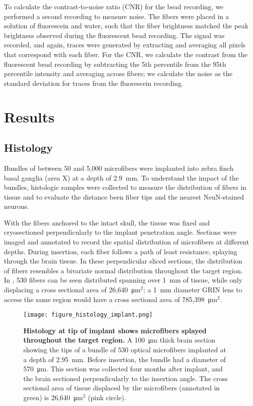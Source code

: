To calculate the contrast-to-noise ratio (CNR) for the bead recording, 
we performed a second recording to measure noise. The fibers were placed 
in a solution of fluorescein and water, such that the fiber brightness 
matched the peak brightness observed during the fluorescent bead recording. 
The signal was recorded, and again, traces were generated by extracting 
and averaging all pixels that correspond with each fiber. For the CNR, we 
calculate the contrast from the fluorescent bead recording by subtracting 
the 5th percentile from the 95th percentile intensity and averaging across 
fibers; we calculate the noise as the standard deviation for traces from 
the fluorescein recording.

\section{Results}

\subsection{Histology}

Bundles of between 50 and 5,000 microfibers were implanted into 
zebra finch basal ganglia (area X) at a depth of 2.9~mm. To 
understand the impact of the bundles, histologic samples 
were collected to measure the distribution of 
fibers in tissue and to evaluate the distance been fiber tips and 
the nearest NeuN-stained neurons.

With the fibers anchored to the intact skull, the tissue was 
fixed and cryosectioned perpendicularly to the implant penetration 
angle. Sections were imaged and annotated to record the spatial 
distribution of microfibers at different depths. During insertion, 
each fiber follows a path of least resistance, splaying through 
the brain tissue. In these perpendicular sliced sections, the 
distribution of fibers resembles a bivariate normal distribution 
throughout the target region. In , 530 fibers can 
be seen distributed spanning over 1~mm of tissue, while only 
displacing a cross sectional area of 26,640~\si{\micro\meter}$^2$; a 
1~mm diameter GRIN lens to access the same region would have a 
cross sectional area of 785,398~\si{\micro\meter}$^2$.

\begin{figure}
\texttt{[image: figure\_histology\_implant.png]}
\caption[Histology showing microfibers splayed 
throughout target region.]{\textbf{Histology at tip of implant shows 
microfibers splayed throughout the target region.} 
A 100~\si{\micro\meter} thick brain section showing the tips of a 
bundle of 530 optical microfibers implanted at a 
depth of 2.95~mm. Before insertion, the bundle had a 
diameter of 570~\si{\micro\meter}. This section was 
collected four months after implant, and the brain sectioned 
perpendicularly to the insertion angle. The cross sectional  
area of tissue displaced by the microfibers 
(annotated in green) is 26,640~\si{\micro\meter}$^2$ 
(pink circle).}
\label{fig:histology_implant}
\end{figure}

